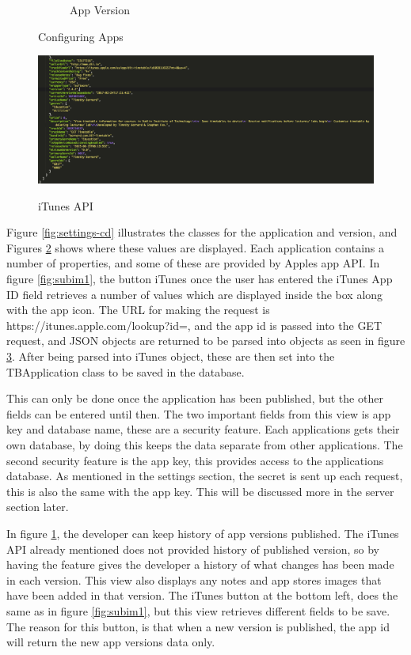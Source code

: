 \begin{figure}[!h]
\begin{subfigure}{0.5\textwidth}
        \caption{App Version}
        \label{fig:subim2}
    \end{subfigure}
\caption{Configuring Apps}
\label{fig:app-version}
\end{figure}

\begin{figure}[!h]
    \caption{iTunes API}
    \centering
    \includegraphics[width=150mm]{images/itunes-api}
    \label{fig:itunes-API}
\end{figure} 

Figure \ref{fig:settings-cd} illustrates the classes for the application and version, and Figures \ref{fig:app-version} shows where these values are displayed. Each application contains a number of properties, and some of these are provided by Apples app API. In figure \ref{fig:subim1}, the button iTunes once the user has entered the iTunes App ID field retrieves a number of values which are displayed inside the box along with the app icon. The URL for making the request is https://itunes.apple.com/lookup?id=, and the app id is passed into the GET request, and JSON objects are returned to be parsed into objects as seen in figure \ref{fig:itunes-API}. After being parsed into iTunes object, these are then set into the TBApplication class to be saved in the database.

This can only be done once the application has been published, but the other fields can be entered until then. The two important fields from this view is app key and database name, these are a security feature. Each applications gets their own database, by doing this keeps the data separate from other applications. The second security feature is the app key, this provides access to the applications database. As mentioned in the settings section, the secret is sent up each request, this is also the same with the app key. This will be discussed more in the server section later. 

In figure \ref{fig:subim2}, the developer can keep history of app versions published. The iTunes API already mentioned does not provided history of published version, so by having the feature gives the developer a history of what changes has been made in each version. This view also displays any notes and app stores images that have been added in that version. The iTunes button at the bottom left, does the same as in figure \ref{fig:subim1}, but this view retrieves different fields to be save. The reason for this button, is that when a new version is published, the app id will return the new app versions data only.

